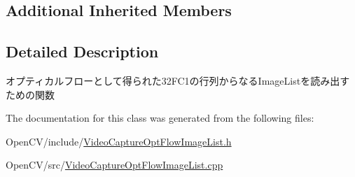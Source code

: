 \subsection*{Additional Inherited Members}


\subsection{Detailed Description}
オプティカルフローとして得られた32\+F\+C1の行列からなる\+Image\+Listを読み出すための関数 

The documentation for this class was generated from the following files\+:\begin{DoxyCompactItemize}
\item 
Open\+C\+V/include/\hyperlink{_video_capture_opt_flow_image_list_8h}{Video\+Capture\+Opt\+Flow\+Image\+List.\+h}\item 
Open\+C\+V/src/\hyperlink{_video_capture_opt_flow_image_list_8cpp}{Video\+Capture\+Opt\+Flow\+Image\+List.\+cpp}\end{DoxyCompactItemize}
